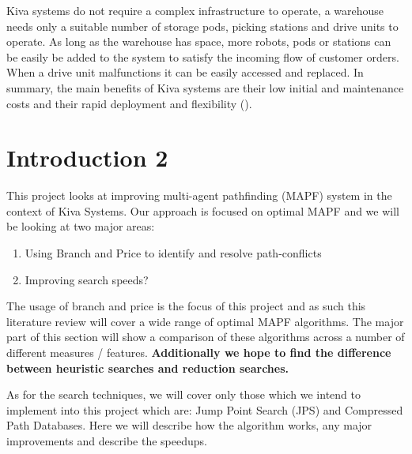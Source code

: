 \documentclass[a4paper,11pt]{article}
\begin{document}

Kiva systems do not require a complex infrastructure to operate, a warehouse needs only a suitable number of storage pods, picking stations and drive units to operate. As long as the warehouse has space, more robots, pods or stations can be easily be added to the system to satisfy the incoming flow of customer orders. When a drive unit malfunctions it can be easily accessed and replaced. In summary, the main benefits of Kiva systems are their low initial and maintenance costs and their rapid deployment and flexibility (\cite{wurman2008coordinating}).


\section{Introduction 2}
This project looks at improving multi-agent pathfinding (MAPF) system in the context of Kiva Systems. Our approach is focused on optimal MAPF and we will be looking at two major areas:

\begin{enumerate}
	\item Using Branch and Price to identify and resolve path-conflicts
	\item Improving search speeds?
\end{enumerate}

The usage of branch and price is the focus of this project and as such this 
literature review will cover a wide range of optimal MAPF algorithms. The major part of this section will show a comparison of these algorithms across a number of different measures / features. \textbf{Additionally we hope to find the difference between heuristic searches and reduction searches.}

As for the search techniques, we will cover only those which we intend to implement into this project which are: Jump Point Search (JPS) and Compressed Path Databases. Here we will describe how the algorithm works, any major improvements and describe the speedups.
\end{document}

